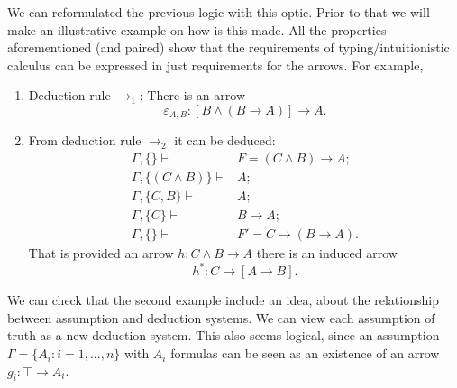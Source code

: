 We can reformulated the previous logic with this optic. Prior to that we will make an illustrative example on how is this made. All the properties aforementioned (and paired) show that the requirements of typing/intuitionistic calculus can be expressed in just requirements for the arrows. For example, 
\begin{example}
  \begin{enumerate}
  \item Deduction rule $\to_1$: There is an arrow $$\varepsilon_{A,B}: [B\land (B \to A)] \to A.$$
  \item From deduction rule $\to_2$ it can be deduced:
    \begin{align*}
      \Gamma,\{\} \vdash & F= (C\land B)\to A;\\
      \Gamma, \{(C\land B)\} \vdash & A;\\
      \Gamma, \{C, B\} \vdash & A;\\
      \Gamma, \{C\} \vdash & B\to A;\\
      \Gamma, \{\} \vdash & F'=C \to (B \to A).
    \end{align*}
    That is provided an arrow $h: C\land B \to A$ there is an induced arrow
    $$h^*:C \to [A\to B].$$
  \end{enumerate}
\end{example}

We can check that the second example include an idea, about the relationship between assumption and deduction systems. We can view each assumption of truth as a new deduction system. This also seems logical, since an assumption $\Gamma = \{A_i : i=1,...,n\}$  with $A_i$ formulas can be seen as an existence of an arrow $g_i: \top \to A_i$.\\




